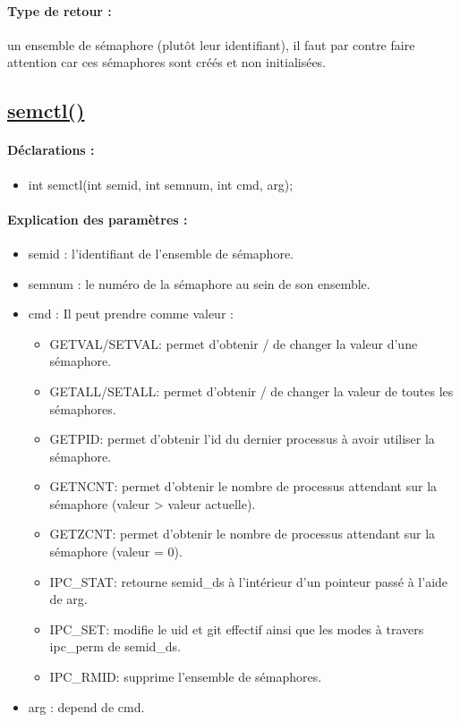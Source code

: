 \documentclass{article}[12pt]
\begin{document}
\paragraph{Type de retour : } un ensemble de sémaphore (plutôt leur identifiant), il faut par contre faire attention car ces sémaphores sont créés et non initialisées.
\subsection{\href{http://jp.barralis.com/linux-man/man2/semctl.2.php}{semctl()}}
\paragraph{Déclarations : }
\begin{itemize}
	\item int semctl(int semid, int semnum, int cmd, arg); 
\end{itemize}
\paragraph{Explication des paramètres : }
\begin{itemize}
\item semid : l'identifiant de l'ensemble de sémaphore.
\item semnum : le numéro de la sémaphore au sein de son ensemble.
\item cmd : Il peut prendre comme valeur :  
\begin{itemize}
	\item GETVAL/SETVAL: permet d'obtenir / de changer la valeur d'une sémaphore.
	\item GETALL/SETALL: permet d'obtenir / de changer la valeur de toutes les sémaphores.
	\item GETPID: permet d'obtenir l'id du dernier processus à avoir utiliser la sémaphore.
	\item GETNCNT: permet d'obtenir le nombre de processus attendant sur la sémaphore (valeur > valeur actuelle).
	\item GETZCNT: permet d'obtenir le nombre de processus attendant sur la sémaphore (valeur = 0).
	\item IPC\_STAT: retourne semid\_ds à l'intérieur d'un pointeur passé à l'aide de arg.
	\item IPC\_SET: modifie le uid et git effectif ainsi que les modes à travers ipc\_perm de  semid\_ds.
	\item IPC\_RMID: supprime l'ensemble de sémaphores.
\end{itemize}
\item arg :  depend de cmd. 
\end{itemize}
\end{document}
